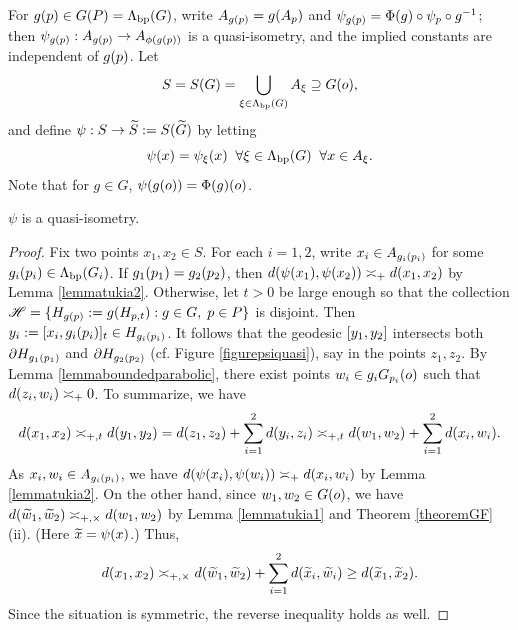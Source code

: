 {For $g(p)\in G(P) = \Lambda_{\mathrm{bp}}(G)$, write $A_{g(p)} = g(A_p)$ and $\psi_{g(p)} = \Phi(g)\circ\psi_p\circ g^{-1}$; then $\psi_{g(p)}: A_{g(p)}\to A_{\phi(g(p))}$ is a quasi-isometry, and the implied constants are independent of $g(p)$. Let
\[
S = S(G) = \bigcup_{\xi\in \Lambda_{\mathrm{bp}}(G)} A_\xi \supseteq G(o),
\]
and define $\psi:S\to \widetilde S := S(\widetilde G)$ by letting
\[
\psi(x) = \psi_\xi(x) \;\;\forall \xi\in \Lambda_{\mathrm{bp}}(G) \;\;\forall x\in A_\xi.
\]
Note that for $g\in G$, $\psi(g(o)) = \Phi(g)(o)$.
\begin{lemma}
\label{lemmapsiquasi}
$\psi$ is a quasi-isometry.
\end{lemma}
\begin{proof}
Fix two points $x_1,x_2\in S$. For each $i = 1,2$, write $x_i \in A_{g_i(p_i)}$ for some $g_i(p_i)\in \Lambda_{\mathrm{bp}}(G_i)$. If $g_1(p_1) = g_2(p_2)$, then $d(\psi(x_1),\psi(x_2)) \asymp_+ d(x_1,x_2)$ by Lemma \ref{lemmatukia2}. Otherwise, let $t > 0$ be large enough so that the collection $\mathscr H = \{H_{g(p)} := g(H_{p,t}) : g\in G, \; p\in P\}$ is disjoint. Then $y_i := [x_i,g_i(p_i)]_t \in H_{g_i(p_i)}$. It follows that the geodesic $[y_1,y_2]$ intersects both $\partial H_{g_1(p_1)}$ and $\partial H_{g_2(p_2)}$ (cf. Figure \ref{figurepsiquasi}), say in the points $z_1,z_2$. By Lemma \ref{lemmaboundedparabolic}, there exist points $w_i\in g_i G_{p_i}(o)$ such that $d(z_i,w_i) \asymp_+ 0$. To summarize, we have
\[
d(x_1,x_2) \asymp_{+,t} d(y_1,y_2) = d(z_1,z_2) + \sum_{i = 1}^2 d(y_i,z_i) \asymp_{+,t} d(w_1,w_2) + \sum_{i = 1}^2 d(x_i,w_i).
\]
As $x_i,w_i\in A_{g_i(p_i)}$, we have $d(\psi(x_i),\psi(w_i)) \asymp_+ d(x_i,w_i)$ by Lemma \ref{lemmatukia2}. On the other hand, since $w_1,w_2\in G(o)$, we have $d(\widetilde w_1,\widetilde w_2) \asymp_{+,\times} d(w_1,w_2)$ by Lemma \ref{lemmatukia1} and Theorem \ref{theoremGF}(ii). (Here $\widetilde x = \psi(x)$.) Thus,
\[
d(x_1,x_2) \asymp_{+,\times} d(\widetilde w_1,\widetilde w_2) + \sum_{i = 1}^2 d(\widetilde x_i,\widetilde w_i) \geq d(\widetilde x_1,\widetilde x_2).
\]
Since the situation is symmetric, the reverse inequality holds as well.
\end{proof}

}

